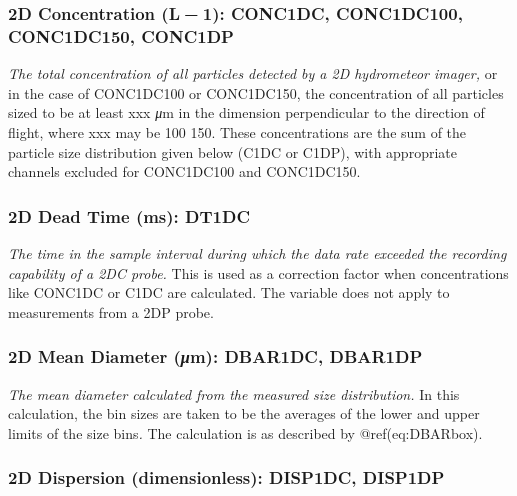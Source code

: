 \documentclass[
  english,
]{book}
\begin{document}
\hypertarget{conc2d}{%
\subsubsection*{\texorpdfstring{2D Concentration (L{ − 1}): CONC1DC,
CONC1DC100, CONC1DC150,
CONC1DP}{2D Concentration (L − 1): CONC1DC, CONC1DC100, CONC1DC150, CONC1DP}}\label{conc2d}}

\emph{The total concentration of all particles detected by a 2D
hydrometeor imager,} or in the case of CONC1DC100 or CONC1DC150, the
concentration of all particles sized to be at least xxx {\emph{μ}}m in
the dimension perpendicular to the direction of flight, where xxx may be
100 150. These concentrations are the sum of the particle size
distribution given below (C1DC or C1DP), with appropriate channels
excluded for CONC1DC100 and CONC1DC150.

\hypertarget{dt1dc}{%
\subsubsection*{2D Dead Time (ms): DT1DC}\label{dt1dc}}

\emph{The time in the sample interval during which the data rate
exceeded the recording capability of a 2DC probe.} This is used as a
correction factor when concentrations like CONC1DC or C1DC are
calculated. The variable does not apply to measurements from a 2DP
probe.

\hypertarget{dbar2d}{%
\subsubsection*{\texorpdfstring{2D Mean Diameter ({\emph{μ}}m): DBAR1DC,
DBAR1DP}{2D Mean Diameter (μm): DBAR1DC, DBAR1DP}}\label{dbar2d}}

\emph{The mean diameter calculated from the measured size distribution.}
In this calculation, the bin sizes are taken to be the averages of the
lower and upper limits of the size bins\emph{.} The calculation is as
described by @ref(eq:DBARbox).

\hypertarget{disp2d}{%
\subsubsection*{2D Dispersion (dimensionless): DISP1DC,
DISP1DP}\label{disp2d}}
\end{document}
